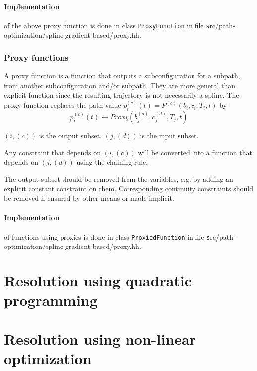 \documentclass {article}
\newcommand\subspline[5]{P^{#1}(#2, #3, #4, #5)}
\newcommand\subsplinea[3]{\subspline{#1}{b_{#2}}{c_{#2}}{T_{#2}}{#3}}
\begin{document}
\paragraph{Implementation} of the above proxy function is done in class \texttt{ProxyFunction}
in file {\texttt src/path-optimization/spline-gradient-based/proxy.hh}.

\subsubsection{Proxy functions}
A proxy function is a function that outputs a subconfiguration for a subpath,
from another subconfiguration and/or subpath.
They are more general than explicit function since the resulting trajectory is not
necessarily a spline.
The proxy function replaces the path value
$ p_i^{(c)}(t) = \subsplinea{(c)}{i}{t} $ by
$$ p_i^{(c)}(t) \gets Proxy (b_j^{(d)}, c_j^{(d)}, T_j, t) $$

$(i,(c))$ is the output subset. $(j,(d))$ is the input subset.

Any constraint that depends on $(i, (c))$ will be converted into
a function that depends on $(j, (d))$ using the chaining rule.

The output subset should be removed from the variables,
e.g. by adding an explicit constant constraint on them.
Corresponding continuity constraints should be removed
if ensured by other means or made implicit.

\paragraph{Implementation} of functions using proxies is done in class
\texttt{ProxiedFunction} 
in file {\texttt src/path-optimization/spline-gradient-based/proxy.hh}.

\section{Resolution using quadratic programming}

\section{Resolution using non-linear optimization}
\end{document}
